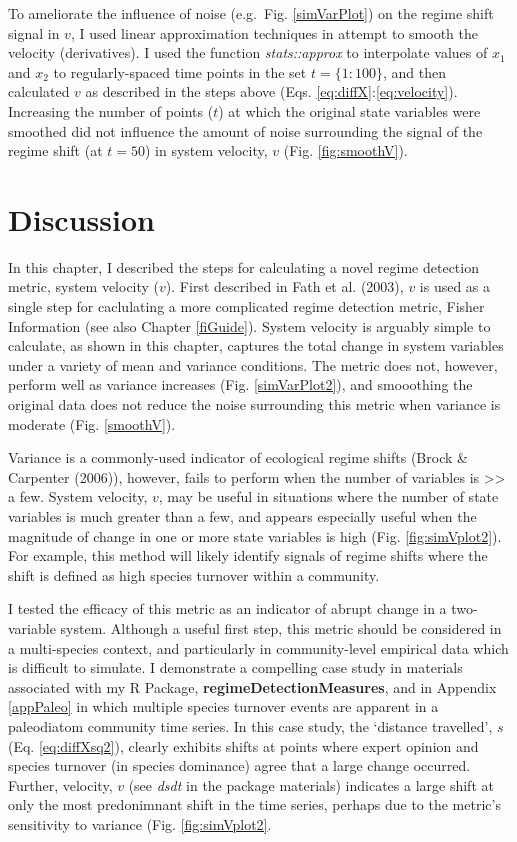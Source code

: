 \documentclass[12pt,twoside,openany]{reedthesis}
\begin{document}
To ameliorate the influence of noise (e.g.~Fig. \ref{simVarPlot}) on the regime shift signal in \(v\), I used linear approximation techniques in attempt to smooth the velocity (derivatives). I used the function \emph{stats::approx} to interpolate values of \(x_1\) and \(x_2\) to regularly-spaced time points in the set \(t=\{1:100\}\), and then calculated \(v\) as described in the steps above (Eqs. \eqref{eq:diffX}:\eqref{eq:velocity}). Increasing the number of points (\(t\)) at which the original state variables were smoothed did not influence the amount of noise surrounding the signal of the regime shift (at \(t=50\)) in system velocity, \(v\) (Fig. \ref{fig:smoothV}).

\hypertarget{discussion-3}{%
\section{Discussion}\label{discussion-3}}

In this chapter, I described the steps for calculating a novel regime detection metric, system velocity (\(v\)). First described in Fath et al. (2003), \(v\) is used as a single step for caclulating a more complicated regime detection metric, Fisher Information (see also Chapter \ref{fiGuide}). System velocity is arguably simple to calculate, as shown in this chapter, captures the total change in system variables under a variety of mean and variance conditions. The metric does not, however, perform well as variance increases (Fig. \ref{simVarPlot2}), and smooothing the original data does not reduce the noise surrounding this metric when variance is moderate (Fig. \ref{smoothV}).

Variance is a commonly-used indicator of ecological regime shifts (Brock \& Carpenter (2006)), however, fails to perform when the number of variables is \textgreater{}\textgreater{} a few. System velocity, \(v\), may be useful in situations where the number of state variables is much greater than a few, and appears especially useful when the magnitude of change in one or more state variables is high (Fig. \ref{fig:simVplot2}). For example, this method will likely identify signals of regime shifts where the shift is defined as high species turnover within a community.

I tested the efficacy of this metric as an indicator of abrupt change in a two-variable system. Although a useful first step, this metric should be considered in a multi-species context, and particularly in community-level empirical data which is difficult to simulate. I demonstrate a compelling case study in materials associated with my R Package, \textbf{regimeDetectionMeasures}, and in Appendix \ref{appPaleo} in which multiple species turnover events are apparent in a paleodiatom community time series. In this case study, the `distance travelled', \(s\) (Eq. \eqref{eq:diffXsq2}), clearly exhibits shifts at points where expert opinion and species turnover (in species dominance) agree that a large change occurred. Further, velocity, \(v\) (see \emph{dsdt} in the package materials) indicates a large shift at only the most predonimnant shift in the time series, perhaps due to the metric's sensitivity to variance (Fig. \ref{fig:simVplot2}.
\end{document}
